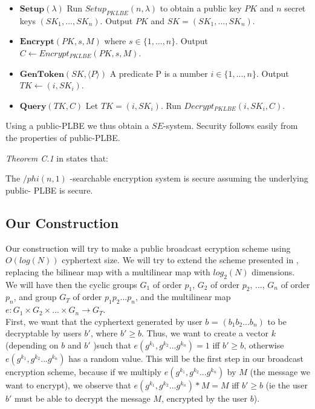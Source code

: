 \documentclass[a4paper, 12pt, oneside]{article}
\begin{document}
\begin{itemize}

\item $\mathbf{Setup}(\lambda)$ Run $Setup_{PKLBE} (n, \lambda)$ to obtain a public key $PK$ and $n$ secret keys $(SK_1 , . . . , SK_n)$.
Output $PK$ and $SK = (SK_1 , . . . , SK_n)$.

\item $\mathbf{Encrypt}(PK, s, M )$ where $s \in \{1, . . . , n\}$. 
Output $C \leftarrow Encrypt_{PKLBE}(PK, s, M )$. 

\item $\mathbf{GenToken}(SK, \langle P \rangle)$ A predicate P is a number $i \in \{1, . . . , n\}$. Output $TK \leftarrow (i, SK_i)$.

\item $\mathbf{Query}(TK, C)$ Let $TK = (i, SK_i)$. Run $Decrypt_{PKLBE}(i, SK_i , C)$.

\end{itemize}

Using a public-PLBE we thus obtain a $SE$-system. Security follows easily from the properties of public-PLBE. 

\textit{Theorem C.1} in \cite{bowa} states that:

The $/phi(n,1)$ -searchable encryption system is secure assuming the underlying public-
PLBE is secure.


\subsection{Our Construction}

Our construction will try to make a public broadcast ecryption scheme using $O(log(N))$ cyphertext size. We will try to extend the scheme presented in \cite{traitor}, replacing the bilinear map with a multilinear map with $log_2(N)$ dimensions.\\

We will have then the cyclic groups $G_1$ of order $p_1$, $G_2$ of order $p_2$, ..., $G_n$ of order $p_n$, and group $G_T$ of order $p_1p_2...p_n$, and the multilinear map $e : G_1 \times G_2 \times ... \times G_n \rightarrow G_T$.\\

First, we want that the cyphertext generated by user $b$ = $(b_1b_2...b_n)$ to be decryptable by users $b'$, where $b' \geq b$. 
Thus, we want to create a vector $k$ (depending on $b$ and $b'$ )such that $e(g^{k_1}, g^{k_2}...g^{k_n}) = 1 $ iff $b' \geq b$, otherwise $e(g^{k_1}, g^{k_2}...g^{k_n})$ has a random value. This will be the first step in our broadcast encryption scheme, because if we multiply $e(g^{k_1}, g^{k_2}...g^{k_n})$ by $M$ (the message we want to encrypt), we observe that $e(g^{k_1}, g^{k_2}...g^{k_n}) * M = M$ iff $b' \geq b$ (ie the user $b'$ must be able to decrypt the message $M$, encrypted by the user $b$).
\end{document}
